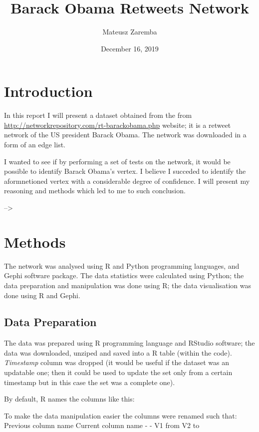 \documentclass[
]{article}
\title{Barack Obama Retweets Network}
\author{Mateusz Zaremba}
\date{December 16, 2019}
\begin{document}
\maketitle

\hypertarget{introduction}{%
\section{Introduction}\label{introduction}}

In this report I will present a dataset obtained from the from
\url{http://networkrepository.com/rt-barackobama.php} website; it is a
retweet network of the US president Barack Obama. The network was
downloaded in a form of an edge list.

I wanted to see if by performing a set of tests on the network, it would
be possible to identify Barack Obama's vertex. I believe I succeded to
identify the aformnetioned vertex with a considerable degree of
confidence. I will present my reasoning and methods which led to me to
such conclusion.

--\textgreater{}

\hypertarget{methods}{%
\section{Methods}\label{methods}}

The network was analysed using R and Python programming languages, and
Gephi software package. The data statistics were calculated using
Python; the data preparation and manipulation was done using R; the data
visualisation was done using R and Gephi.

\hypertarget{data-preparation}{%
\subsection{Data Preparation}\label{data-preparation}}

The data was prepared using R programming language and RStudio software;
the data was downloaded, unziped and saved into a R table (within the
code). \emph{Timestamp} column was dropped (it would be useful if the
dataset was an updatable one; then it could be used to update the set
only from a certain timestamp but in this case the set was a complete
one).

By default, R names the columns like this:

To make the data manipulation easier the columns were renamed such that:
\textbar{} Previous column name \textbar{} Current column name
\textbar{} \textbar{} - \textbar{} - \textbar{} \textbar{} V1 \textbar{}
from \textbar{} \textbar{} V2 \textbar{} to \textbar{}
\end{document}
